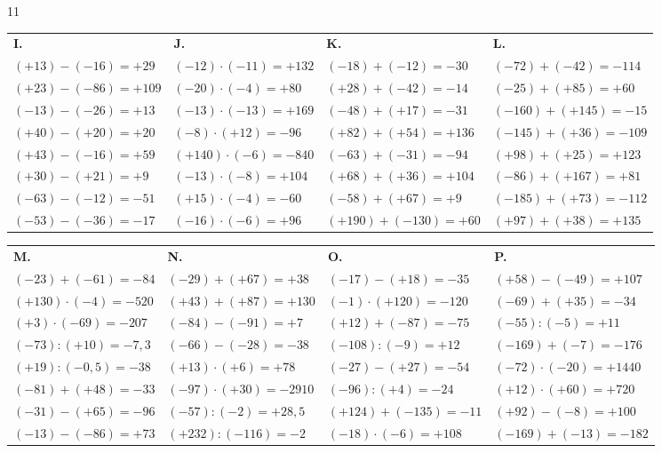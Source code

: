 \begin{solution}{11}
\bigskip
\begin{tabularx}{\linewidth}{*{4}{X}}
\textbf{I.} & \textbf{J.} & \textbf{K.} & \textbf{L.} \\
$(+13)-(-16)=+29$ & $(-12)\cdot(-11)=+132$ & $(-18)+(-12)=-30$ & $(-72)+(-42)=-114$ \\
$(+23)-(-86)=+109$ & $(-20)\cdot(-4)=+80$ & $(+28)+(-42)=-14$ & $(-25)+(+85)=+60$ \\
$(-13)-(-26)=+13$ & $(-13)\cdot(-13)=+169$ & $(-48)+(+17)=-31$ & $(-160)+(+145)=-15$ \\
$(+40)-(+20)=+20$ & $(-8)\cdot(+12)=-96$ & $(+82)+(+54)=+136$ & $(-145)+(+36)=-109$ \\
$(+43)-(-16)=+59$ & $(+140)\cdot(-6)=-840$ & $(-63)+(-31)=-94$ & $(+98)+(+25)=+123$ \\
$(+30)-(+21)=+9$ & $(-13)\cdot(-8)=+104$ & $(+68)+(+36)=+104$ & $(-86)+(+167)=+81$ \\
$(-63)-(-12)=-51$ & $(+15)\cdot(-4)=-60$ & $(-58)+(+67)=+9$ & $(-185)+(+73)=-112$ \\
$(-53)-(-36)=-17$ & $(-16)\cdot(-6)=+96$ & $(+190)+(-130)=+60$ & $(+97)+(+38)=+135$ \\
\end{tabularx}

\bigskip
\begin{tabularx}{\linewidth}{*{4}{X}}
\textbf{M.} & \textbf{N.} & \textbf{O.} & \textbf{P.} \\
$(-23)+(-61)=-84$ & $(-29)+(+67)=+38$ & $(-17)-(+18)=-35$ & $(+58)-(-49)=+107$ \\
$(+130)\cdot(-4)=-520$ & $(+43)+(+87)=+130$ & $(-1)\cdot(+120)=-120$ & $(-69)+(+35)=-34$ \\
$(+3)\cdot(-69)=-207$ & $(-84)-(-91)=+7$ & $(+12)+(-87)=-75$ & $(-55):(-5)=+11$ \\
$(-73):(+10)=-7{,}3$ & $(-66)-(-28)=-38$ & $(-108):(-9)=+12$ & $(-169)+(-7)=-176$ \\
$(+19):(-0{,}5)=-38$ & $(+13)\cdot(+6)=+78$ & $(-27)-(+27)=-54$ & $(-72)\cdot(-20)=+1440$ \\
$(-81)+(+48)=-33$ & $(-97)\cdot(+30)=-2910$ & $(-96):(+4)=-24$ & $(+12)\cdot(+60)=+720$ \\
$(-31)-(+65)=-96$ & $(-57):(-2)=+28{,}5$ & $(+124)+(-135)=-11$ & $(+92)-(-8)=+100$ \\
$(-13)-(-86)=+73$ & $(+232):(-116)=-2$ & $(-18)\cdot(-6)=+108$ & $(-169)+(-13)=-182$ \\
\end{tabularx}

\end{solution}

